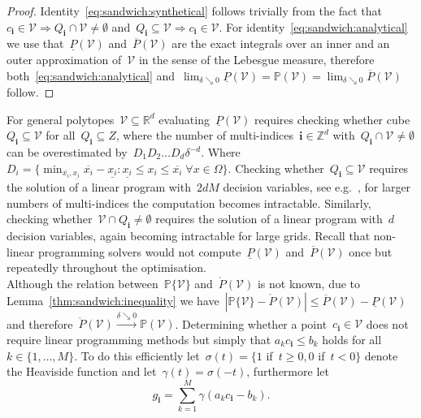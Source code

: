 \documentclass[letterpaper, 10pt, conference]{ieeeconf} %
\providecommand{\abs}[1]{\left\lvert#1\right\rvert}
\providecommand{\bfa}[1]{\mathbf{#1}}
\begin{document}
%
\begin{proof}
Identity~\eqref{eq:sandwich:synthetical} follows trivially from the fact that~$c_\bfa{i}\in\mathcal V\Rightarrow Q_\bfa{i}\cap\mathcal V\neq\emptyset$ and~$Q_\bfa{i}\subseteq\mathcal V\Rightarrow c_\bfa{i}\in\mathcal V$.
%
For identity~\eqref{eq:sandwich:analytical} we use that~$\underline P(\mathcal V)$ and~$\overline{P}(\mathcal V)$ are the exact integrals over an inner and an outer approximation of~$\mathcal V$ in the sense of the Lebesgue measure, therefore both~\eqref{eq:sandwich:analytical} and~$\lim_{\delta\searrow0}\underline{P}(\mathcal V)=\mathbb{P}(\mathcal V)=\lim_{\delta\searrow0}\overline{P}(\mathcal V)$ follow.
\end{proof}
%
For general polytopes~$\mathcal V\subseteq\mathbb R^d$ evaluating~$\underline{P}(\mathcal V)$ requires checking whether cube~$Q_\bfa{i}\subseteq\mathcal V$ for all~$Q_\bfa{i}\subseteq Z$, where the number of multi-indices~$\bfa{i}\in\mathbb Z^d$ with~$Q_\bfa{i}\cap\mathcal V\neq\emptyset$ can be overestimated by~$D_1D_2\dots D_d \delta^{-d}$.
%
Where $D_i = \{\min_{\overline{x_i},\underline{x_i}} \overline{x_i}-\underline{x_i} : \underline{x_i}\leq x_i\leq\overline{x_i}\; \forall x\in\Omega\}$.
%
Checking whether~$Q_\bfa{i}\subseteq\mathcal V$ requires the solution of a linear program with~$2dM$ decision variables, see e.g.~\cite{Schaich:thesis}, for larger numbers of multi-indices the computation becomes intractable.
%
Similarly, checking whether~$\mathcal V\cap Q_\bfa{i}\neq\emptyset$ requires the solution of a linear program with~$d$ decision variables, again becoming intractable for large grids.
%
Recall that non-linear programming solvers would not compute~$\underline{P}(\mathcal V)$ and~$\overline{P}(\mathcal V)$ once but repeatedly throughout the optimisation.
%
\\[1em]
%
Although the relation between~$\mathbb P\{\mathcal V\}$ and~$\mathring{P}(\mathcal V)$ is not known, due to Lemma~\ref{thm:sandwich:inequality} we have~$\abs{\mathbb P\{\mathcal V\}-\mathring{P}(\mathcal V)}\leq \overline{P}(\mathcal V)-\underline{P}(\mathcal V)$ and therefore~$\mathring{P}(\mathcal V)\xrightarrow{\delta\searrow0}\mathbb{P}(\mathcal V)$.
%
Determining whether a point~$c_\bfa{i}\in\mathcal V$ does not require linear programming methods but simply that $a_k c_\bfa{i}\leq b_k$ holds for all~$k\in\{1,\dots,M\}$.
%
To do this efficiently let~$\sigma(t)=\{1$ if~$t\geq0, 0$ if~$t<0\}$ denote the Heaviside function and let~$\gamma(t) = \sigma(-t)$, furthermore let
%
\begin{equation}
	g_\bfa{i} = \sum_{k=1}^M\gamma(a_k c_\bfa{i}-b_k).
\end{equation}
\end{document}
